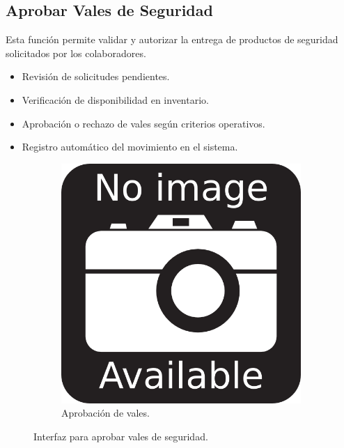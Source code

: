 \subsection{Aprobar Vales de Seguridad}

Esta función permite validar y autorizar la entrega de productos de seguridad solicitados por los colaboradores.

\begin{itemize}
    \item Revisión de solicitudes pendientes.
    \item Verificación de disponibilidad en inventario.
    \item Aprobación o rechazo de vales según criterios operativos.
    \item Registro automático del movimiento en el sistema.
\end{itemize}

\begin{figure}[h]
\centering
\begin{subfigure}{0.4\textwidth}
    \includegraphics[width=\textwidth]{imgs/no-image.png}
    \caption{Aprobación de vales.}
    \label{fig:epp2}
\end{subfigure}
\caption{Interfaz para aprobar vales de seguridad.}
\end{figure}

